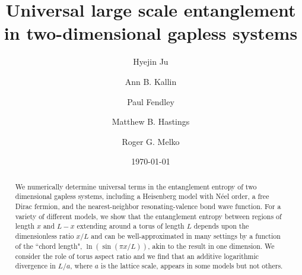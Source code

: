 \documentclass[prl,aps,twocolumn,floatfix,amsmath,amssymb,superscriptaddress,tightenlines]{revtex4}
\begin{document}
\newcommand{\be}{\begin{equation}}
\newcommand{\ee}{\end{equation}}

\date{\today}
\title{Universal large scale entanglement in
  two-dimensional gapless systems}

\author{Hyejin Ju}

\author{Ann B. Kallin}

\author{Paul Fendley}

\author{Matthew B. Hastings}

\author{Roger G. Melko}

\begin{abstract} 
We numerically determine universal terms in the entanglement entropy of two dimensional gapless systems, including a Heisenberg model with
N\'eel order, a free Dirac fermion, and the nearest-neighbor resonating-valence
bond wave function.
For a variety of different models, we show that the entanglement entropy between regions of length $x$ and $L-x$ extending around a torus of
length $L$ depends upon the dimensionless ratio $x/L$ and can be well-approximated in many settings by a function of the ``chord length",
$\ln(\sin(\pi x/L))$, akin to the result in one dimension.
We consider the role of torus aspect ratio and we find that an additive logarithmic divergence in $L/a$, where $a$ is the lattice scale, appears in some models but not others.
\end{abstract}
\maketitle
\end{document}
